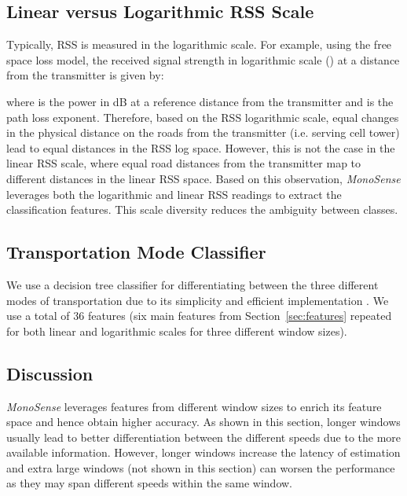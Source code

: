 \documentclass[conference]{IEEEtran}
\def \sys {\textit{MonoSense}}
\begin{document}
\subsection{Linear versus Logarithmic RSS Scale}
Typically, RSS is measured in the logarithmic scale. For example, using the free space loss model, the received signal strength in logarithmic scale () at a distance  from the transmitter is given by:

where  is the power in dB at a reference distance  from the transmitter and  is the path loss exponent.
Therefore, based on the RSS logarithmic scale, equal changes in the physical distance on the roads from the transmitter (i.e. serving cell tower) lead to equal distances in the RSS log space. However, this is not the case in the linear RSS scale, where equal road distances from the transmitter map to different distances in the linear RSS space. Based on this observation, \sys{} leverages both the logarithmic and linear RSS readings to extract the classification features. This scale diversity reduces the ambiguity between classes.

	
		

















\subsection{Transportation Mode Classifier}\label{sec:classifier}

We use a decision tree classifier for differentiating between the three different modes of transportation due to its simplicity and efficient implementation . We use a total of 36 features (six main features from Section~\ref{sec:features} repeated for both linear and logarithmic scales for three different window sizes).

\subsection{Discussion}
\sys{} leverages features from different window sizes to enrich its feature space and hence obtain higher accuracy. As shown in this section, longer windows usually lead to better differentiation between the different speeds due to the more available information. However, longer windows increase the latency of estimation and extra large windows (not shown in this section) can worsen the performance as they may span different speeds within the same window.
\end{document}
